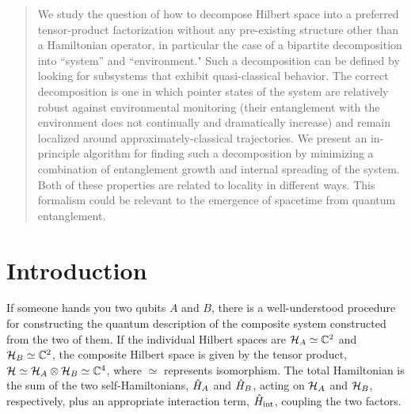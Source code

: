 \documentclass[aps,pra,onecolumn,nofootinbib,notitlepage,11pt,tightenlines]{revtex4-1}
\begin{document}
\newcommand{\sean}[1]{\textbf{\color{red}[#1]}}
\newcommand{\ashmeet}[1]{\textbf{\color{blue}{#1}}}
\begin{abstract}
We study the question of how to decompose Hilbert space into a preferred tensor-product factorization without any pre-existing structure other than a Hamiltonian operator, in particular the case of a bipartite decomposition into ``system'' and ``environment."
Such a decomposition can be defined by looking for subsystems that exhibit quasi-classical behavior.
The correct decomposition is one in which pointer states of the system are relatively robust against environmental monitoring (their entanglement with the environment does not continually and dramatically increase) and remain localized around approximately-classical trajectories. 
We present an in-principle algorithm for finding such a decomposition by minimizing a combination of entanglement growth and internal spreading of the system.
Both of these properties are related to locality in different ways.
This formalism could be relevant to the emergence of spacetime from quantum entanglement.
\end{abstract}

\maketitle

\newpage

\tableofcontents

\newpage

\section{Introduction}

If someone hands you two qubits $A$ and $B$, there is a well-understood procedure for constructing the quantum description of the composite system constructed from the two of them.
If the individual Hilbert spaces are $\mathcal{H}_A\simeq \mathbb{C}^2$ and $\mathcal{H}_B\simeq \mathbb{C}^2$, the composite Hilbert space is given by the tensor product, $\mathcal{H} \simeq \mathcal{H}_A\otimes \mathcal{H}_B \simeq \mathbb{C}^4$, where $\simeq$ represents isomorphism.
The total Hamiltonian is the sum of the two self-Hamiltonians, $\hat{H}_A$ and $\hat{H}_B$, acting on $\mathcal{H}_A$ and $\mathcal{H}_B$, respectively, plus an appropriate interaction term, $\hat{H}_{\rm{int}}$, coupling the two factors.
\end{document}
